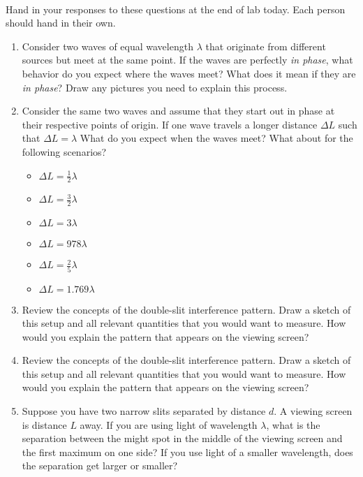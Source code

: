 \documentclass{tufte-handout}
\begin{document}



\vspace{0.5cm}
\\
\vspace{0.5cm}

Hand in your responses to these questions at the end of lab today. Each person should hand in their own.

\begin{enumerate}

\item Consider two waves of equal wavelength $\lambda$ that originate from 
different sources but meet at the same point.
If the waves are perfectly {\it in phase}, what behavior do you expect where the waves meet?
What does it mean if they are {\it in phase}? Draw any pictures you need to explain this process.

\item Consider the same two waves and assume that they start out in phase at their respective
points of origin. If one wave travels a longer distance $\Delta L$ such that $\Delta L = \lambda$
What do you expect when the waves meet? What about for the following scenarios?
\begin{itemize}[itemsep=0pt,parsep=0pt,topsep=0pt,partopsep=0pt]
    \item $\Delta L = \frac{1}{2}\lambda$
    \item $\Delta L = \frac{3}{2}\lambda$
    \item $\Delta L = 3\lambda$
    \item $\Delta L = 978\lambda$
    \item $\Delta L = \frac{2}{5}\lambda$
    \item $\Delta L = 1.769\lambda$
\end{itemize}

\item Review the concepts of the double-slit interference pattern. Draw a sketch of this setup and
all relevant quantities that you would want to measure. How would you explain the pattern that appears on the 
viewing screen?

\item Review the concepts of the double-slit interference pattern. Draw a sketch of this setup and
all relevant quantities that you would want to measure. How would you explain the pattern that appears on the 
viewing screen?

\item Suppose you have two narrow slits separated by distance $d$. A viewing screen is distance $L$ away. If you are
using light of wavelength $\lambda$, what is the separation between the might spot in the middle of
the viewing screen and the first maximum on one side? If you use light of a smaller wavelength, does
the separation get larger or smaller?


\end{enumerate}
\end{document}

